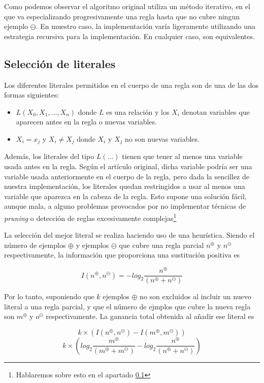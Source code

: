 Como podemos observar el algoritmo original utiliza un método iterativo, en el que va especializando progresivamente una regla hasta que no cubre ningun ejemplo $\ominus$. En muestro caso, la implementación varía ligeramente utilizando una estrategia recursiva para la implementación. En cualquier caso, son equivalentes.

\subsection{Selección de literales}
Los diferentes literales permitidos en el cuerpo de una regla son de una de las dos formas siguientes:
\begin{itemize}
\item $L(X_{0},X_{1},...,X_{n})$ donde $L$ es una relación y los $X_{i}$ denotan variables que aparecen antes en la regla o nuevas variables.
\item $X_{i} = x_{j}$ y $X_{i} \neq X_{j}$ donde $X_{i}$ y $X_{j}$ no son nuevas variables.
\end{itemize}

Además, los literales del tipo $L(...)$ tienen que tener al menos una variable usada antes en la regla. Según el artículo original, dicha variable podría ser una variable usada anteriormente en el cuerpo de la regla, pero dada la sencillez de nuestra implementación, los literales quedan restringidos a usar al menos una variable que aparezca en la cabeza de la regla. Esto supone una solución fácil, aunque mala, a alguno problemas provocados por no implementar técnicas de \emph{pruning} o detección de reglas excesivamente complejas\footnote{Hablaremos sobre esto en el apartado \ref{}}
  
La selección del mejor literal se realiza haciendo uso de una heurística. Siendo el número de ejemplos $\oplus$ y ejemplos $\ominus$ que cubre una regla parcial $n^{\oplus}$ y $n^{\ominus}$ respectivamente, la información que proporciona una sustitución positiva es

\begin{equation}
  I(n^{\oplus}, n^{\ominus}) = - log_{2} \frac{n^{\oplus}}{(n^{\oplus} + n^{\ominus})}
\end{equation}

Por lo tanto, suponiendo que $k$ ejemplos $\oplus$ no son excluidos al incluir un nuevo literal a una regla parcial, y que el número de ejmplos que cubre la nueva regla son $m^{\oplus}$ y $o^{\ominus}$ respectivamente. La ganancia total obtenida al añadir ese literal es

\begin{equation}
  k \times (I(n^{\oplus}, n^{\ominus}) - I(m^{\oplus}, m^{\ominus})) 
\end{equation}
\begin{equation}
  k \times (log_{2} \frac{m^{\oplus}}{(m^{\oplus} + m^{\ominus})} - log_{2} \frac{n^{\oplus}}{(n^{\oplus} + n^{\ominus})})
\end{equation}
